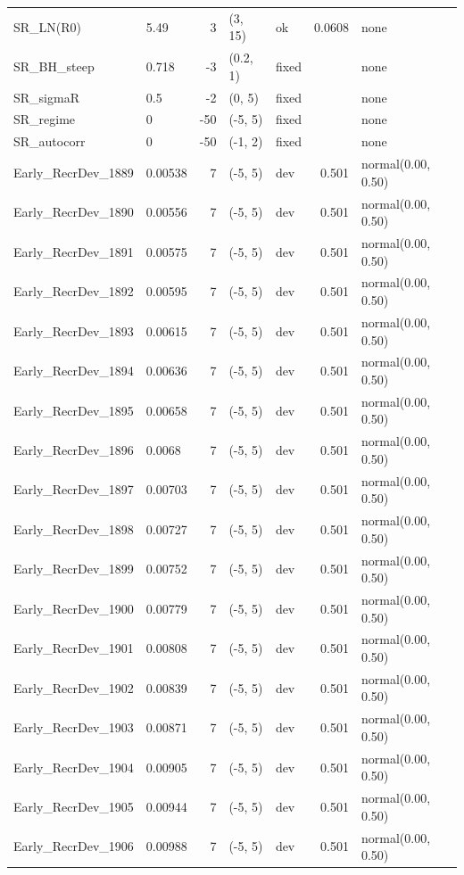 \documentclass[
]{scrartcl}
\begin{document}
\begin{landscape}
\begin{longtable}{llrllrl}
SR\_LN(R0) & 5.49 & 3 & (3, 15) & ok & 0.0608 & none \\ 
SR\_BH\_steep & 0.718 & -3 & (0.2, 1) & fixed &  & none \\ 
SR\_sigmaR & 0.5 & -2 & (0, 5) & fixed &  & none \\ 
SR\_regime & 0 & -50 & (-5, 5) & fixed &  & none \\ 
SR\_autocorr & 0 & -50 & (-1, 2) & fixed &  & none \\ 
Early\_RecrDev\_1889 & 0.00538 & 7 & (-5, 5) & dev & 0.501 & normal(0.00, 0.50) \\ 
Early\_RecrDev\_1890 & 0.00556 & 7 & (-5, 5) & dev & 0.501 & normal(0.00, 0.50) \\ 
Early\_RecrDev\_1891 & 0.00575 & 7 & (-5, 5) & dev & 0.501 & normal(0.00, 0.50) \\ 
Early\_RecrDev\_1892 & 0.00595 & 7 & (-5, 5) & dev & 0.501 & normal(0.00, 0.50) \\ 
Early\_RecrDev\_1893 & 0.00615 & 7 & (-5, 5) & dev & 0.501 & normal(0.00, 0.50) \\ 
Early\_RecrDev\_1894 & 0.00636 & 7 & (-5, 5) & dev & 0.501 & normal(0.00, 0.50) \\ 
Early\_RecrDev\_1895 & 0.00658 & 7 & (-5, 5) & dev & 0.501 & normal(0.00, 0.50) \\ 
Early\_RecrDev\_1896 & 0.0068 & 7 & (-5, 5) & dev & 0.501 & normal(0.00, 0.50) \\ 
Early\_RecrDev\_1897 & 0.00703 & 7 & (-5, 5) & dev & 0.501 & normal(0.00, 0.50) \\ 
Early\_RecrDev\_1898 & 0.00727 & 7 & (-5, 5) & dev & 0.501 & normal(0.00, 0.50) \\ 
Early\_RecrDev\_1899 & 0.00752 & 7 & (-5, 5) & dev & 0.501 & normal(0.00, 0.50) \\ 
Early\_RecrDev\_1900 & 0.00779 & 7 & (-5, 5) & dev & 0.501 & normal(0.00, 0.50) \\ 
Early\_RecrDev\_1901 & 0.00808 & 7 & (-5, 5) & dev & 0.501 & normal(0.00, 0.50) \\ 
Early\_RecrDev\_1902 & 0.00839 & 7 & (-5, 5) & dev & 0.501 & normal(0.00, 0.50) \\ 
Early\_RecrDev\_1903 & 0.00871 & 7 & (-5, 5) & dev & 0.501 & normal(0.00, 0.50) \\ 
Early\_RecrDev\_1904 & 0.00905 & 7 & (-5, 5) & dev & 0.501 & normal(0.00, 0.50) \\ 
Early\_RecrDev\_1905 & 0.00944 & 7 & (-5, 5) & dev & 0.501 & normal(0.00, 0.50) \\ 
Early\_RecrDev\_1906 & 0.00988 & 7 & (-5, 5) & dev & 0.501 & normal(0.00, 0.50) \\ 

\end{longtable}
\end{landscape}
\end{document}
